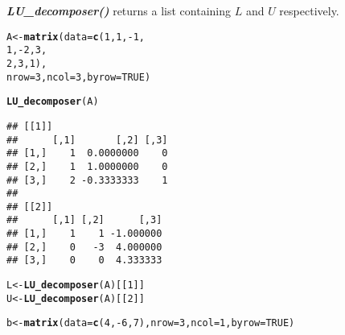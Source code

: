 \documentclass[11pt, a4paper]{article}\usepackage[]{graphicx}\usepackage[]{xcolor}
\makeatletter
\newcommand{\hlnum}[1]{\textcolor[rgb]{0.686,0.059,0.569}{#1}}%
\newcommand{\hlopt}[1]{\textcolor[rgb]{0,0,0}{#1}}%
\newcommand{\hldef}[1]{\textcolor[rgb]{0.345,0.345,0.345}{#1}}%
\newcommand{\hlkwb}[1]{\textcolor[rgb]{0.69,0.353,0.396}{#1}}%
\newcommand{\hlkwc}[1]{\textcolor[rgb]{0.333,0.667,0.333}{#1}}%
\newcommand{\hlkwd}[1]{\textcolor[rgb]{0.737,0.353,0.396}{\textbf{#1}}}%
\newenvironment{kframe}{%
 \def\at@end@of@kframe{}%
 \ifinner\ifhmode%
  \def\at@end@of@kframe{\end{minipage}}%
  \begin{minipage}{\columnwidth}%
 \fi\fi%
 \def\FrameCommand##1{\hskip\@totalleftmargin \hskip-\fboxsep
 \colorbox{shadecolor}{##1}\hskip-\fboxsep
     \hskip-\linewidth \hskip-\@totalleftmargin \hskip\columnwidth}%
 \MakeFramed {\advance\hsize-\width
   \@totalleftmargin\z@ \linewidth\hsize
   \@setminipage}}%
 {\par\unskip\endMakeFramed%
 \at@end@of@kframe}
\newenvironment{knitrout}{}{} %
\makeatother
\begin{document}
\textbf{\textit{LU\_decomposer()}} returns a list containing $L$ and $U$ respectively.

\begin{knitrout}
\color{fgcolor}\begin{kframe}
\begin{alltt}
\hldef{A} \hlkwb{<-} \hlkwd{matrix}\hldef{(}\hlkwc{data} \hldef{=} \hlkwd{c}\hldef{(}\hlnum{1}\hldef{,} \hlnum{1}\hldef{,} \hlopt{-}\hlnum{1}\hldef{,}
                     \hlnum{1}\hldef{,} \hlopt{-}\hlnum{2}\hldef{,} \hlnum{3}\hldef{,}
                     \hlnum{2}\hldef{,} \hlnum{3}\hldef{,} \hlnum{1}\hldef{),}
            \hlkwc{nrow} \hldef{=} \hlnum{3}\hldef{,} \hlkwc{ncol} \hldef{=} \hlnum{3}\hldef{,} \hlkwc{byrow} \hldef{=} \hlnum{TRUE}\hldef{)}
\end{alltt}
\end{kframe}
\end{knitrout}

\begin{knitrout}
\color{fgcolor}\begin{kframe}
\begin{alltt}
\hlkwd{LU_decomposer}\hldef{(A)}
\end{alltt}
\begin{verbatim}
## [[1]]
##      [,1]       [,2] [,3]
## [1,]    1  0.0000000    0
## [2,]    1  1.0000000    0
## [3,]    2 -0.3333333    1
## 
## [[2]]
##      [,1] [,2]      [,3]
## [1,]    1    1 -1.000000
## [2,]    0   -3  4.000000
## [3,]    0    0  4.333333
\end{verbatim}
\end{kframe}
\end{knitrout}

\begin{knitrout}
\color{fgcolor}\begin{kframe}
\begin{alltt}
\hldef{L} \hlkwb{<-} \hlkwd{LU_decomposer}\hldef{(A)[[}\hlnum{1}\hldef{]]}
\hldef{U} \hlkwb{<-} \hlkwd{LU_decomposer}\hldef{(A)[[}\hlnum{2}\hldef{]]}
\end{alltt}
\end{kframe}
\end{knitrout}


\faArrowAltCircleRight[regular] \hspace{0.2cm}

\begin{knitrout}
\color{fgcolor}\begin{kframe}
\begin{alltt}
\hldef{b} \hlkwb{<-} \hlkwd{matrix}\hldef{(}\hlkwc{data} \hldef{=} \hlkwd{c}\hldef{(}\hlnum{4}\hldef{,} \hlopt{-}\hlnum{6}\hldef{,} \hlnum{7}\hldef{),} \hlkwc{nrow} \hldef{=} \hlnum{3}\hldef{,} \hlkwc{ncol} \hldef{=} \hlnum{1}\hldef{,} \hlkwc{byrow} \hldef{=} \hlnum{TRUE}\hldef{)}
\end{alltt}
\end{kframe}
\end{knitrout}
\end{document}
